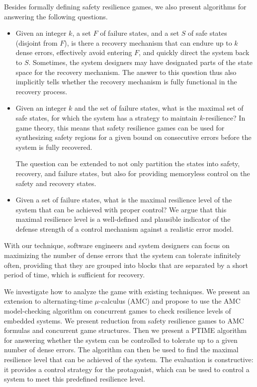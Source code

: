 Besides formally defining safety resilience games, we also present algorithms 
for answering the following questions.  
\label{reply2.alg.sfrch.res}
\begin{itemize} 
\item Given an integer $k$, a set $F$ of failure states, and 
  a set $S$ of safe states (disjoint from $F$), is there a recovery mechanism that 
  can endure up to $k$ dense errors, 
  effectively avoid entering $F$, and quickly direct the system back to $S$.  
  Sometimes, the system designers may have designated parts of the state space 
  for the recovery mechanism.  
  The answer to this question thus also implicitly tells 
  whether the recovery 
  mechanism is fully functional in the recovery process. 
\item Given an integer $k$ and the set of failure states, 
  what is the maximal set of safe states, 
  for which the system has a strategy to maintain $k$-resilience?
  In game theory, this means that 
  safety resilience games can be used for synthesizing safety regions 
  for a given bound on consecutive errors before the system is fully recovered.  
  
The question can be extended to not only partition the states into safety, recovery, and failure states, but also for providing memoryless control on the safety and recovery states.
  
\item Given a set of failure states, what is the maximal resilience level of the system that can be achieved with proper control?  
  We argue that this maximal resilience level is a well-defined and plausible indicator of 
  the defense strength of a control mechanism against a realistic error model. 
\end{itemize} 
With our technique, 
software engineers and system designers 
can focus on maximizing the number of dense errors that 
the system can tolerate infinitely often, providing that they are grouped into blocks that are separated by a short period of time, which is sufficient for recovery.

We investigate how to analyze the game with existing techniques. 
We present an extension to alternating-time $\mu$-calculus (AMC) 
and propose to use the AMC model-checking algorithm on concurrent games to check 
resilience levels of embedded systems. 
We present reduction from safety resilience games to 
AMC formulas and concurrent game structures.  
Then we present a PTIME algorithm for answering whether the system can be 
controlled to tolerate up to a given number of dense errors.  
The algorithm can then be used to find the maximal resilience level 
that can be achieved of the system. 
The evaluation is constructive:  
it provides a control strategy  
for the protagonist, which can be used to control a system 
to meet this predefined resilience level.  

